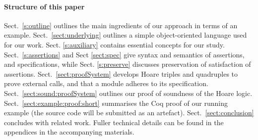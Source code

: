  \paragraph{Structure of this paper}
Sect.\ \ref{s:outline}   outlines the main ingredients of our approach in terms of an {example}.
Sect.\ \ref{sect:underlying} outlines a simple object-oriented language used for our work. 
 Sect. \ref{s:auxiliary}  {contains essential concepts for our study}.
Sect.\ \ref{s:assertions} and 
 Sect \ref{sect:spec}  give syntax and semantics of assertions, and  specifications,
{while Sect. \ref{s:preserve} discusses preservation of satisfaction of assertions.}
Sect.\ \ref{sect:proofSystem} develops Hoare triples and quadruples to prove external calls, and that a module adheres to its %
 specification.
Sect.\ \ref{sect:sound:proofSystem} outlines {our} proof of soundness of
the Hoare logic. 
Sect.\ \ref{sect:example:proof:short} summarises  the Coq proof
  of  our running example (the source code will be submitted as an artefact). 
 Sect.\ \ref{sect:conclusion} concludes with related work. 
Fuller technical details can be found in the appendices in the accompanying materials. 

 

